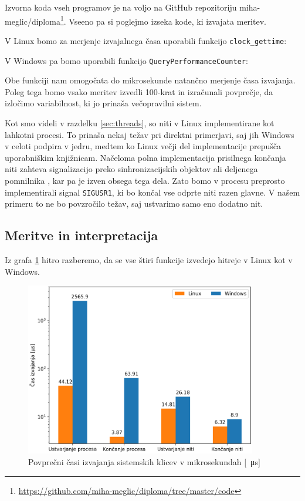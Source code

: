\documentclass[a4paper,12pt,openright]{book}
\begin{document}
Izvorna koda vseh programov je na voljo na GitHub repozitoriju miha-meglic/diploma\footnote{\url{https://github.com/miha-meglic/diploma/tree/master/code}}.
Vseeno pa si poglejmo izseka kode, ki izvajata meritev.

V Linux bomo za merjenje izvajalnega časa uporabili funkcijo \texttt{clock\_gettime}:


V Windows pa bomo uporabili funkcijo \texttt{QueryPerformanceCounter}:


Obe funkciji nam omogočata do mikrosekunde natančno merjenje časa izvajanja.
Poleg tega bomo vsako meritev izvedli 100-krat in izračunali povprečje, da izločimo variabilnost, ki jo prinaša večopravilni sistem.

Kot smo videli v razdelku \ref{sec:threads}, so niti v Linux implementirane kot lahkotni procesi.
To prinaša nekaj težav pri direktni primerjavi, saj jih Windows v celoti podpira v jedru, medtem ko Linux večji del implementacije prepušča uporabniškim knjižnicam.
Načeloma polna implementacija prisilnega končanja niti zahteva signalizacijo preko sinhronizacijskih objektov ali deljenega pomnilnika \cite{Mueller_1993}, kar pa je izven obsega tega dela.
Zato bomo v procesu preprosto implementirali signal \texttt{SIGUSR1}, ki bo končal vse odprte niti razen glavne.
V našem primeru to ne bo povzročilo težav, saj ustvarimo samo eno dodatno nit.

\subsection{Meritve in interpretacija}

Iz grafa \ref{fig:syscall_comparison:times} hitro razberemo, da se vse štiri funkcije izvedejo hitreje v Linux kot v Windows.

\begin{figure}[h!]
	\begin{center}
		\includegraphics[width=0.9\textwidth]{images/syscall_comparison.png}
	\end{center}
	\caption{Povprečni časi izvajanja sistemskih klicev v mikrosekundah [\SI{}{\micro\second}]}
	\label{fig:syscall_comparison:times}
\end{figure}
\end{document}
